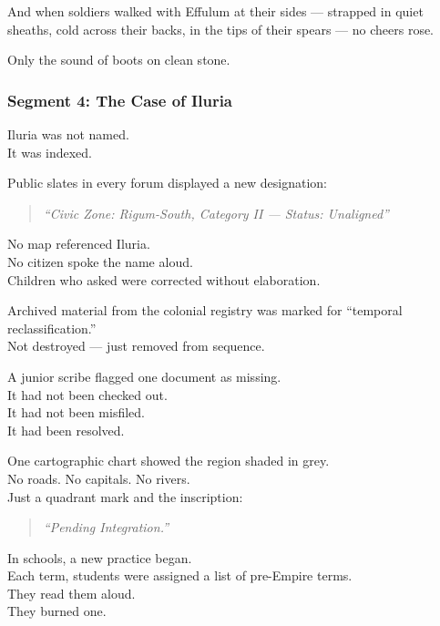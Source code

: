 \documentclass[9pt]{article}
\begin{document}
And when soldiers walked with Effulum at their sides — strapped in quiet sheaths, cold across their backs, in the tips of their spears — no cheers rose.

Only the sound of boots on clean stone.

\newpage

\subsubsection*{Segment 4: The Case of Iluria}

Iluria was not named.\\
It was indexed.

Public slates in every forum displayed a new designation:

\begin{quote}
\textit{“Civic Zone: Rigum-South, Category II — Status: Unaligned”}
\end{quote}

No map referenced Iluria.\\
No citizen spoke the name aloud.\\
Children who asked were corrected without elaboration.

\vspace{1em}

Archived material from the colonial registry was marked for “temporal reclassification.”\\
Not destroyed — just removed from sequence.

A junior scribe flagged one document as missing.\\
It had not been checked out.\\
It had not been misfiled.\\
It had been resolved.

\vspace{1em}

One cartographic chart showed the region shaded in grey.\\
No roads. No capitals. No rivers.\\
Just a quadrant mark and the inscription:

\begin{quote}
\textit{“Pending Integration.”}
\end{quote}

\vspace{1em}

In schools, a new practice began.\\
Each term, students were assigned a list of pre-Empire terms.\\
They read them aloud.\\
They burned one.
\end{document}
